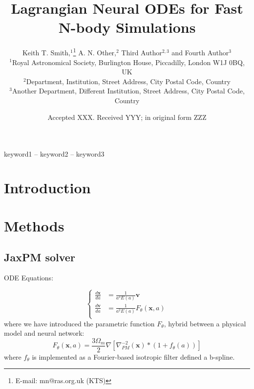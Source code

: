 \documentclass[fleqn,usenatbib]{mnras}
\title[LNODE]{Lagrangian Neural ODEs for Fast N-body Simulations}
\author[K. T. Smith et al.]{
Keith T. Smith,$^{1}$\thanks{E-mail: mn@ras.org.uk (KTS)}
A. N. Other,$^{2}$
Third Author$^{2,3}$
and Fourth Author$^{3}$
\\
$^{1}$Royal Astronomical Society, Burlington House, Piccadilly, London W1J 0BQ, UK\\
$^{2}$Department, Institution, Street Address, City Postal Code, Country\\
$^{3}$Another Department, Different Institution, Street Address, City Postal Code, Country
}
\date{Accepted XXX. Received YYY; in original form ZZZ}
\newcommand{\github}{\href{https://github.com/DifferentiableUniverseInitiative/JaxPM}{\faGithub}}
\begin{document}
\label{firstpage}
\pagerange{\pageref{firstpage}--\pageref{lastpage}}
\maketitle

\begin{abstract}
\github
\end{abstract}

\begin{keywords}
keyword1 -- keyword2 -- keyword3
\end{keywords}



\section{Introduction}


\section{Methods}

\subsection{JaxPM solver}

ODE Equations:

\begin{equation}
    \left\{ \begin{array}{ll}
        \frac{d \mathbf{x}}{d a} & = \frac{1}{a^3 E(a)} \mathbf{v} \\
        \frac{d \mathbf{v}}{d a} & =  \frac{1}{a^2 E(a)} F_\theta(\mathbf{x}, a) \\
    \end{array} \right.
\end{equation}
where we have introduced the parametric function $F_\theta$, hybrid between a physical model and neural network:
\begin{equation}
    F_\theta(\mathbf{x}, a) = \frac{3 \Omega_m}{2}  \nabla \left[ \nabla^{-2}_{PM} (\mathbf{x}) \ast (1 + f_\theta(a)) \right]
\end{equation}
where $f_\theta$ is implemented as a Fourier-based isotropic filter defined a b-spline.
\end{document}
